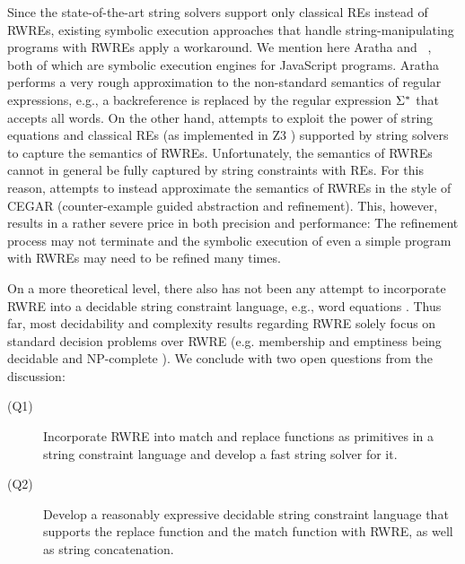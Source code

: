 Since the state-of-the-art string solvers support only classical REs instead of
RWREs, %
existing symbolic execution approaches that handle
string-manipulating programs with RWREs apply a workaround.
We mention here Aratha \cite{aratha} and \expose~\cite{LMK19}, both of which are
symbolic execution engines for JavaScript programs.
Aratha performs a very rough approximation to the 
non-standard semantics of regular expressions, e.g., a backreference
is replaced by the regular expression $\Sigma^*$ that accepts all words.
On the other hand, \expose{} attempts to exploit the power of string 
equations and classical REs (as implemented in Z3 \cite{Z3}) supported by string
solvers to capture the 
semantics of RWREs. Unfortunately, the semantics of RWREs cannot 
in general be fully captured by string constraints with REs. 
For this reason, 
\expose{} attempts to instead approximate the semantics of RWREs in the style of 
CEGAR (counter-example guided abstraction and refinement). This, however,
results in a rather severe price in both precision and performance: The
refinement process may not terminate and the symbolic execution of even a simple
program with RWREs may need to be refined many times.

On a more theoretical level, there also has not been any attempt to incorporate
RWRE into a decidable string constraint language, e.g., word equations
\cite{Gut98}. Thus far, most decidability and complexity results regarding RWRE 
solely focus on standard decision problems over RWRE (e.g. membership and 
emptiness being decidable and NP-complete \cite{FS19,BM17b}). 
We conclude with two open questions from the discussion:
\begin{description}
    \item[(Q1)] Incorporate RWRE into match and replace functions
        as primitives in a string constraint language and develop a 
        fast string solver for it.
    \item[(Q2)] Develop a reasonably expressive decidable string constraint 
        language that supports the replace function and
        the match function with RWRE, as well as string concatenation.
\end{description}

